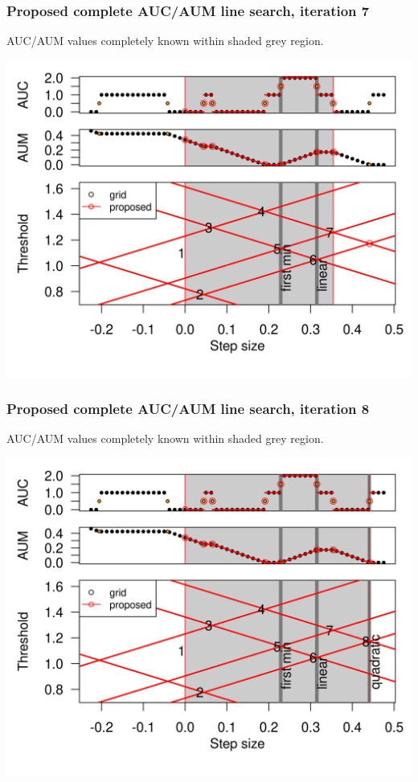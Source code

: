 \begin{frame}
  \frametitle{Proposed complete AUC/AUM line search, iteration 7}
AUC/AUM values completely known within shaded grey region.


  \includegraphics[width=\textwidth]{figure-line-search-example-7}


\end{frame}


\begin{frame}
  \frametitle{Proposed complete AUC/AUM line search, iteration 8}
AUC/AUM values completely known within shaded grey region.


  \includegraphics[width=\textwidth]{figure-line-search-example-8}


\end{frame}
